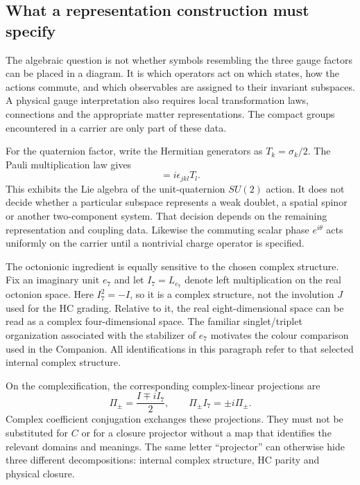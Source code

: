 \subsection{What a representation construction must specify}
The algebraic question is not whether symbols resembling the three
gauge factors can be placed in a diagram. It is which operators act
on which states, how the actions commute, and which observables are
assigned to their invariant subspaces. A physical gauge interpretation
also requires local transformation laws, connections and the appropriate
matter representations. The compact groups encountered in a carrier
are only part of these data.

For the quaternion factor, write the Hermitian generators as
$T_k=\sigma_k/2$. The Pauli multiplication law gives
\begin{equation}
 [T_j,T_k]=i\epsilon_{jkl}T_l.
\end{equation}
This exhibits the Lie algebra of the unit-quaternion $SU(2)$ action.
It does not decide whether a particular subspace represents a weak
doublet, a spatial spinor or another two-component system. That
decision depends on the remaining representation and coupling data.
Likewise the commuting scalar phase $e^{i\theta}$ acts uniformly on
the carrier until a nontrivial charge operator is specified.

The octonionic ingredient is equally sensitive to the chosen complex
structure. Fix an imaginary unit $e_7$ and let $I_7=L_{e_7}$ denote
left multiplication on the real octonion space. Here $I_7^2=-I$,
so it is a complex structure, not the involution $J$ used for the HC
grading. Relative to it, the real eight-dimensional space can be
read as a complex four-dimensional space. The familiar singlet/triplet
organization associated with the stabilizer of $e_7$ motivates the
colour comparison used in the Companion. All identifications in this
paragraph refer to that selected internal complex structure.

On the complexification, the corresponding complex-linear projections
are
\begin{equation}
 \Pi_\pm=\frac{I\mp iI_7}{2},\qquad
 \Pi_\pm I_7=\pm i\Pi_\pm.
\end{equation}
Complex coefficient conjugation exchanges these projections. They
must not be substituted for $C$ or for a closure projector without
a map that identifies the relevant domains and meanings. The same
letter ``projector'' can otherwise hide three different decompositions:
internal complex structure, HC parity and physical closure.

